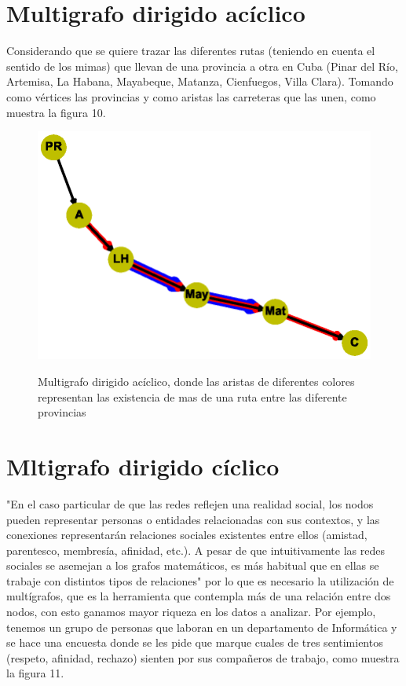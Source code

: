 \documentclass{article}
\begin{document}
\section{Multigrafo dirigido acíclico}
Considerando que se quiere trazar las diferentes rutas (teniendo en cuenta el sentido de los mimas) que llevan de una provincia a otra en Cuba (Pinar del Río, Artemisa, La Habana, Mayabeque, Matanza, Cienfuegos, Villa Clara). Tomando como vértices las provincias y como aristas las carreteras que las unen, como muestra la figura 10.
\begin{center}

\end{center}
\begin{figure}[h]
\begin{center}
\includegraphics[scale=0.7]{Graf10.eps}\\
\caption{Multigrafo dirigido acíclico, donde las aristas de diferentes colores representan las existencia de mas de una ruta entre las diferente provincias}
\end{center}
\end{figure}

\section{Mltigrafo dirigido cíclico}
"En el caso particular de que las redes reflejen una realidad social, los nodos pueden representar personas o entidades relacionadas con sus contextos, y las conexiones representarán relaciones sociales existentes entre ellos (amistad, parentesco, membresía, afinidad, etc.). A pesar de que intuitivamente las redes sociales se asemejan a los grafos matemáticos, es más habitual que en ellas se trabaje con distintos tipos de relaciones"\cite{gf3} por lo que es necesario la utilización de multígrafos, que es la herramienta que contempla más de una relación entre dos nodos, con esto ganamos mayor riqueza en los datos a analizar.\linebreak 
Por ejemplo, tenemos un grupo de personas que laboran en un departamento de Informática y se hace una encuesta donde se les pide que marque cuales de tres sentimientos (respeto, afinidad, rechazo) sienten por sus compañeros de trabajo, como muestra la figura 11.
\end{document}
